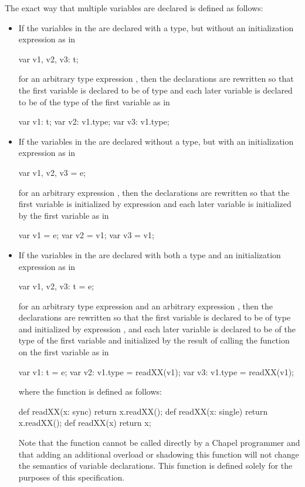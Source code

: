The exact way that multiple variables are declared is defined as
follows:
\begin{itemize}
\item If the variables in the  are declared
with a type, but without an initialization expression as in
\begin{chapel}
var v1, v2, v3: t;
\end{chapel}
for an arbitrary type expression , then the declarations are
rewritten so that the first variable is declared to be of
type  and each later variable is declared to be of the type of
the first variable as in
\begin{chapel}
var v1: t; var v2: v1.type; var v3: v1.type;
\end{chapel}

\item If the variables in the  are declared
without a type, but with an initialization expression as in
\begin{chapel}
var v1, v2, v3 = e;
\end{chapel}
for an arbitrary expression , then the declarations are
rewritten so that the first variable is initialized by
expression  and each later variable is initialized by the
first variable as in
\begin{chapel}
var v1 = e; var v2 = v1; var v3 = v1;
\end{chapel}

\item If the variables in the  are declared
with both a type and an initialization expression as in
\begin{chapel}
var v1, v2, v3: t = e;
\end{chapel}
for an arbitrary type expression  and an arbitrary
expression , then the declarations are rewritten so that the
first variable is declared to be of type  and initialized by
expression , and each later variable is declared to be of the
type of the first variable and initialized by the result of calling
the function  on the first variable as in
\begin{chapel}
var v1: t = e; var v2: v1.type = readXX(v1); var v3: v1.type = readXX(v1);
\end{chapel}
where the function  is defined as follows:
\begin{chapel}
def readXX(x: sync) return x.readXX();
def readXX(x: single) return x.readXX();
def readXX(x) return x;
\end{chapel}
Note that the  function cannot be called directly by a
Chapel programmer and that adding an additional overload or shadowing
this function will not change the semantics of variable declarations.
This function is defined solely for the purposes of this
specification.
\end{itemize}

